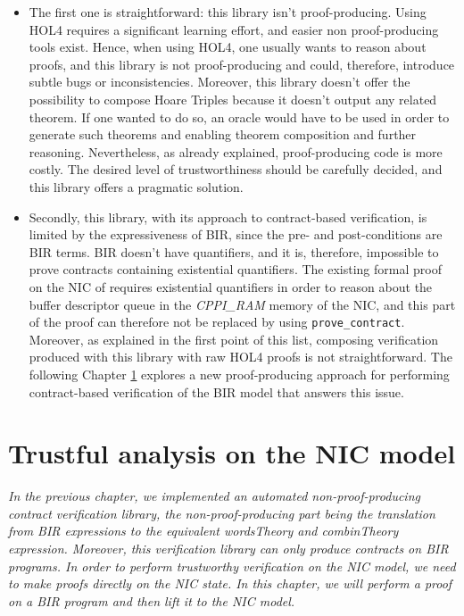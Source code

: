 \documentclass{kththesis}
\begin{document}
{\begin{itemize}
	\item The first one is straightforward: this library isn't \gls{proof-producing}. Using HOL4 requires a significant learning effort, and easier non proof-producing tools exist. Hence, when using HOL4, one usually wants to reason about proofs, and this library is not proof-producing and could, therefore, introduce subtle bugs or inconsistencies. Moreover, this library doesn't offer the possibility to compose Hoare Triples because it doesn't output any related theorem. If one wanted to do so, an oracle would have to be used in order to generate such theorems and enabling theorem composition and further reasoning. Nevertheless, as already explained, proof-producing code is more costly. The desired level of trustworthiness should be carefully decided, and this library offers a pragmatic solution.
	\item Secondly, this library, with its approach to contract-based verification, is limited by the expressiveness of BIR, since the pre- and post-conditions are BIR terms. BIR doesn't have quantifiers, and it is, therefore, impossible to prove contracts containing existential quantifiers. The existing formal proof on the NIC of \cite{haglund_formal_2016} requires existential quantifiers in order to reason about the buffer descriptor queue in the \textit{CPPI\_RAM} memory of the NIC, and this part of the proof can therefore not be replaced by using \texttt{prove\_contract}. Moreover, as explained in the first point of this list, composing verification produced with this library with raw HOL4 proofs is not straightforward. The following Chapter \ref{trustful-nic-analysis} explores a new proof-producing approach for performing contract-based verification of the BIR model that answers this issue.
\end{itemize}

\chapter{Trustful analysis on the NIC model} \label{trustful-nic-analysis}
\vspace{-1cm}
\textit{In the previous chapter, we implemented an automated non-\gls{proof-producing} contract verification library, the non-proof-producing part being the translation from BIR expressions to the equivalent \textit{wordsTheory} and \textit{combinTheory} expression. Moreover, this verification library can only produce contracts on BIR programs. In order to perform trustworthy verification on the \gls{NIC} model, we need to make proofs directly on the \gls{NIC} state. In this chapter, we will perform a proof on a BIR program and then lift it to the \gls{NIC} model.}

}
\end{document}
